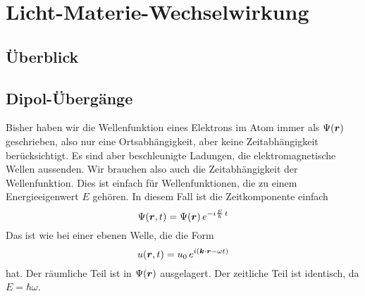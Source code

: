 \renewcommand{\lastmod}{22. November 2024}
\renewcommand{\chapterauthors}{Markus Lippitz}

\chapter{Licht-Materie-Wechselwirkung}





\section{Überblick}








\section{Dipol-Übergänge}

Bisher haben wir die Wellenfunktion eines Elektrons im Atom immer als $\Psi(\boldsymbol{r})$ geschrieben, also nur eine Ortsabhängigkeit, aber keine Zeitabhängigkeit berücksichtigt. Es sind aber beschleunigte Ladungen, die elektromagnetische Wellen aussenden. Wir brauchen also auch die Zeitabhängigkeit der Wellenfunktion. Dies ist einfach für Wellenfunktionen, die zu einem Energieeigenwert $E$ gehören. In diesem Fall ist die Zeitkomponente einfach 
\begin{equation}
    \Psi(\boldsymbol{r}, t) = \Psi(\boldsymbol{r}) \, e^{- i \frac{E}{\hbar} \, t}
\end{equation}
Das ist wie bei einer ebenen Welle, die die Form 
\begin{equation}
    u(\boldsymbol{r}, t) = u_0 \, e^{i ( \boldsymbol{k} \cdot \boldsymbol{r} - \omega t)}
\end{equation}
hat. Der räumliche Teil ist in $\Psi(\boldsymbol{r})$ ausgelagert. Der zeitliche Teil ist identisch, da $E = \hbar \omega$.

